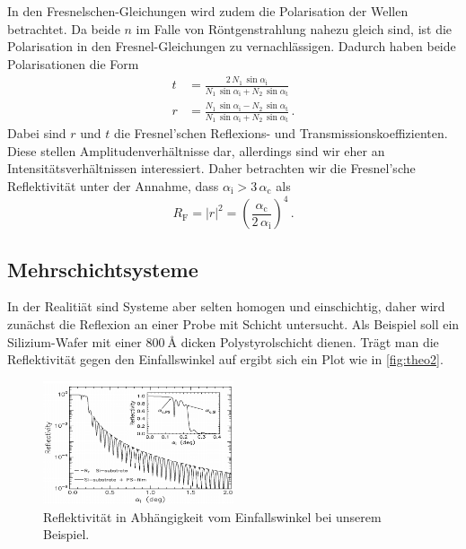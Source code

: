 In den Fresnelschen-Gleichungen wird zudem die Polarisation der Wellen betrachtet.
Da beide $n$ im Falle von Röntgenstrahlung nahezu gleich sind, ist die Polarisation in den Fresnel-Gleichungen zu vernachlässigen.
Dadurch haben beide Polarisationen die Form
\begin{align}
    t &= \frac{2 \, N_1 \, \sin{\alpha _\text{i}} }{N_1 \, \sin{\alpha _\text{i}} + N_2 \, \sin{\alpha _\text{t}}} \\
    r &= \frac{N_1 \, \sin{\alpha _\text{i}} - N_2 \, \sin{\alpha _\text{t}}}{N_1 \, \sin{\alpha _\text{i}} + N_2 \, \sin{\alpha _\text{t}}} \,.
\end{align}
Dabei sind $r$ und $t$ die Fresnel'schen Reflexions- und Transmissionskoeffizienten. 
Diese stellen Amplitudenverhältnisse dar, allerdings sind wir eher an Intensitätsverhältnissen interessiert.
Daher betrachten wir die Fresnel'sche Reflektivität unter der Annahme, dass $\alpha _\text{i} > 3 \, \alpha _\text{c}$ als 
\begin{equation}
    R_\text{F} = |r|^2 = \left( \frac{{\alpha _\text{c}}}{2 \, \alpha _\text{i}}  \right)^4 \,.
    \label{eq:reflek}
\end{equation}

\subsection{Mehrschichtsysteme}
\label{theo2}

In der Realitiät sind Systeme aber selten homogen und einschichtig, daher wird zunächst die Reflexion an einer Probe mit Schicht untersucht.
Als Beispiel soll ein Silizium-Wafer mit einer $\SI{800}{\angstrom}$ dicken Polystyrolschicht dienen. 
Trägt man die Reflektivität gegen den Einfallswinkel auf ergibt sich ein Plot wie in \autoref{fig:theo2}.

\begin{figure}
    \centering
    \includegraphics[width=0.5\textwidth]{images/plot.png}
    \caption{Reflektivität in Abhängigkeit vom Einfallswinkel bei unserem Beispiel. \cite{V44old}}
    \label{fig:theo2}
\end{figure}

